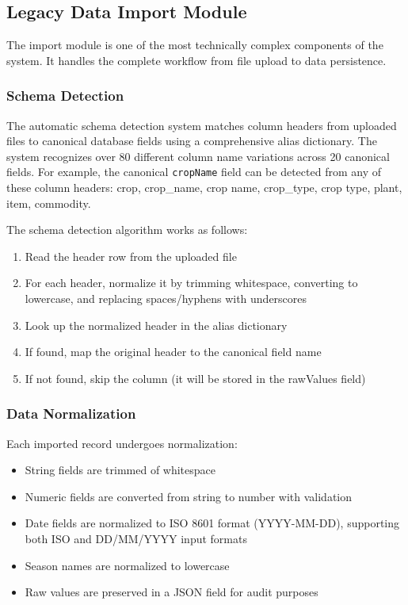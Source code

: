 \subsection{Legacy Data Import Module}

The import module is one of the most technically complex components of the system. It handles the complete workflow from file upload to data persistence.

\subsubsection{Schema Detection}

The automatic schema detection system matches column headers from uploaded files to canonical database fields using a comprehensive alias dictionary. The system recognizes over 80 different column name variations across 20 canonical fields. For example, the canonical \texttt{cropName} field can be detected from any of these column headers: crop, crop\_name, crop name, crop\_type, crop type, plant, item, commodity.

The schema detection algorithm works as follows:
\begin{enumerate}
  \item Read the header row from the uploaded file
  \item For each header, normalize it by trimming whitespace, converting to lowercase, and replacing spaces/hyphens with underscores
  \item Look up the normalized header in the alias dictionary
  \item If found, map the original header to the canonical field name
  \item If not found, skip the column (it will be stored in the rawValues field)
\end{enumerate}

\subsubsection{Data Normalization}

Each imported record undergoes normalization:
\begin{itemize}
  \item String fields are trimmed of whitespace
  \item Numeric fields are converted from string to number with validation
  \item Date fields are normalized to ISO 8601 format (YYYY-MM-DD), supporting both ISO and DD/MM/YYYY input formats
  \item Season names are normalized to lowercase
  \item Raw values are preserved in a JSON field for audit purposes
\end{itemize}

